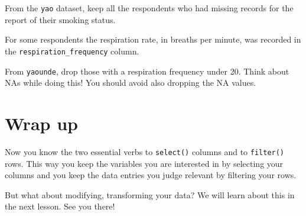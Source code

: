 \documentclass[
  letterpaper,
  DIV=11,
  numbers=noendperiod]{scrreprt}
\begin{document}
\begin{tcolorbox}[enhanced jigsaw, colframe=quarto-callout-tip-color-frame, rightrule=.15mm, opacityback=0, breakable, coltitle=black, colbacktitle=quarto-callout-tip-color!10!white, bottomrule=.15mm, leftrule=.75mm, toprule=.15mm, arc=.35mm, bottomtitle=1mm, colback=white, left=2mm, opacitybacktitle=0.6, titlerule=0mm, title=\textcolor{quarto-callout-tip-color}{\faLightbulb}\hspace{0.5em}{Practice}, toptitle=1mm]

From the \texttt{yao} dataset, keep all the respondents who had missing
records for the report of their smoking status.

\end{tcolorbox}

\begin{tcolorbox}[enhanced jigsaw, colframe=quarto-callout-tip-color-frame, rightrule=.15mm, opacityback=0, breakable, coltitle=black, colbacktitle=quarto-callout-tip-color!10!white, bottomrule=.15mm, leftrule=.75mm, toprule=.15mm, arc=.35mm, bottomtitle=1mm, colback=white, left=2mm, opacitybacktitle=0.6, titlerule=0mm, title=\textcolor{quarto-callout-tip-color}{\faLightbulb}\hspace{0.5em}{Practice}, toptitle=1mm]

For some respondents the respiration rate, in breaths per minute, was
recorded in the \texttt{respiration\_frequency} column.

From \texttt{yaounde}, drop those with a respiration frequency under 20.
Think about NAs while doing this! You should avoid also dropping the NA
values.

\end{tcolorbox}

\hypertarget{wrap-up-4}{%
\section{Wrap up}\label{wrap-up-4}}

Now you know the two essential verbs to \texttt{select()} columns and to
\texttt{filter()} rows. This way you keep the variables you are
interested in by selecting your columns and you keep the data entries
you judge relevant by filtering your rows.

But what about modifying, transforming your data? We will learn about
this in the next lesson. See you there!
\end{document}
